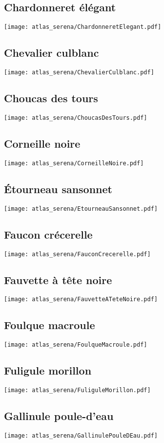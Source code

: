 \subsection{Chardonneret élégant}
\texttt{[image: atlas\_serena/ChardonneretElegant.pdf]}
\subsection{Chevalier culblanc}
\texttt{[image: atlas\_serena/ChevalierCulblanc.pdf]}
\subsection{Choucas des tours}
\texttt{[image: atlas\_serena/ChoucasDesTours.pdf]}
\subsection{Corneille noire}
\texttt{[image: atlas\_serena/CorneilleNoire.pdf]}
\subsection{Étourneau sansonnet}
\texttt{[image: atlas\_serena/EtourneauSansonnet.pdf]}
\subsection{Faucon crécerelle}
\texttt{[image: atlas\_serena/FauconCrecerelle.pdf]}
\subsection{Fauvette à tête noire}
\texttt{[image: atlas\_serena/FauvetteATeteNoire.pdf]}
\subsection{Foulque macroule}
\texttt{[image: atlas\_serena/FoulqueMacroule.pdf]}
\subsection{Fuligule morillon}
\texttt{[image: atlas\_serena/FuliguleMorillon.pdf]}
\subsection{Gallinule poule-d’eau}
\texttt{[image: atlas\_serena/GallinulePouleDEau.pdf]}
